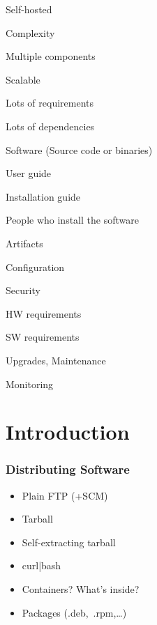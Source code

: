 

\begin{iframe}
\item Self-hosted
\item Complexity
\item Multiple components
\item Scalable
\item Lots of requirements
\item Lots of dependencies
\end{iframe}

\begin{iframe}[Distribution]
\item Software (Source code or binaries)
\item User guide
\item Installation guide
\item People who install the software
\end{iframe}

\begin{iframe}
\item Artifacts
\item Configuration
\item Security
\item HW requirements
\item SW requirements
\item Upgrades, Maintenance
\item Monitoring
\end{iframe}


\section{Introduction}
\begin{frame}
    \frametitle{Distributing Software}
    \begin{itemize}
        \item {Plain FTP (+SCM)}
        \item {Tarball}
        \item {Self-extracting tarball}
        \item {curl|bash}
        \item {Containers? What's inside?}
        \item {Packages (.deb,~.rpm,\dots)}
    \end{itemize}
\end{frame}

